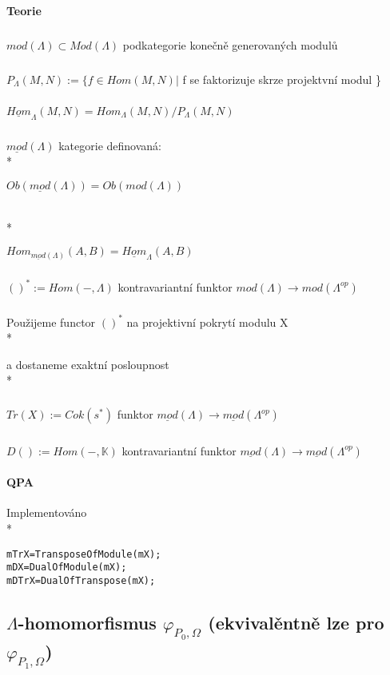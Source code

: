 \documentclass[7pt]{article}
\begin{document}
      \paragraph{Teorie} 
      \subparagraph{} $mod(\Lambda) \subset Mod(\Lambda)$ podkategorie konečně 
      generovaných modulů
      \subparagraph{} $P_\Lambda(M,N):=\{f\in Hom(M,N)|$ f se faktorizuje skrze 
      projektvní modul \}
      \subparagraph{} $\underline{Hom}_\Lambda(M,N) = Hom_\Lambda(M,N) / 
      P_\Lambda(M,N)$
      \subparagraph{} $\underline{mod}(\Lambda)$ kategorie definovaná: \\*
        \centerline{$Ob(\underline{mod}(\Lambda))=Ob(mod(\Lambda))$} \\*
        \centerline{$Hom_{\underline{mod}(\Lambda)}(A,B)=\underline{Hom}_\Lambda(A,B)$}
      \subparagraph{} $()^*:= Hom(-,\Lambda)$ kontravariantní funktor $mod(\Lambda)\rightarrow mod(\Lambda^{op})$      
      \subparagraph{} Použijeme functor $()^*$ na projektivní pokrytí modulu X  \\*
        \centerline{  }
        a dostaneme exaktní posloupnost \\*
        \centerline{  }      
      \subparagraph{} $Tr(X):=Cok(s^*)$ funktor $\underline{mod}(\Lambda)\rightarrow\underline{mod}(\Lambda^{op})$
      \subparagraph{} $D():=Hom(-,\mathbb{K})$ kontravariantní funktor $\underline{mod}(\Lambda)\rightarrow\underline{mod}(\Lambda^{op})$     
      
      \paragraph{QPA} Implementováno \\*
\begin{verbatim}
mTrX=TransposeOfModule(mX);
mDX=DualOfModule(mX);
mDTrX=DualOfTranspose(mX);
\end{verbatim}

    \subsection{$\Lambda$-homomorfismus $\varphi_{P_0,\Omega}$ (ekvivalěntně lze pro $\varphi_{P_1,\Omega}$)}
\end{document}
